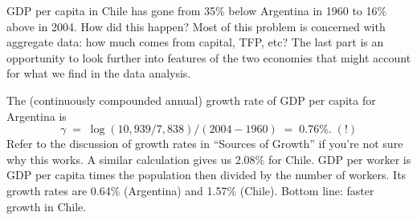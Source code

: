 \documentclass[letterpaper,12pt]{exam}
\begin{document}
\begin{questions}


\begin{solution}
GDP per capita in Chile has gone 
from 35\% below Argentina in 1960 to 16\% above in 2004.
How did this happen?
Most of this problem is concerned with aggregate data:
how much comes from capital, TFP, etc?  
The last part is an opportunity to look further 
into features of the two economies that might account 
for what we find in the data analysis.  
%
\begin{parts}
\item The (continuously compounded annual) 
growth rate of GDP per capita for Argentina is 
\[
    \gamma \;=\; \log (10,939/7,838) / (2004 - 1960) \;=\; 0.76\%. \; (!) 
\]
Refer to the discussion of growth rates in ``Sources of Growth''
if you're not sure why this works.
A similar calculation gives us 2.08\% for Chile.  
GDP per worker is GDP per capita times the population then
divided by the number of workers.  
Its growth rates are 0.64\% (Argentina) and 1.57\% (Chile).  
Bottom line:  faster growth in Chile.  


\end{parts}
\end{solution}
\end{questions}
\end{document}

